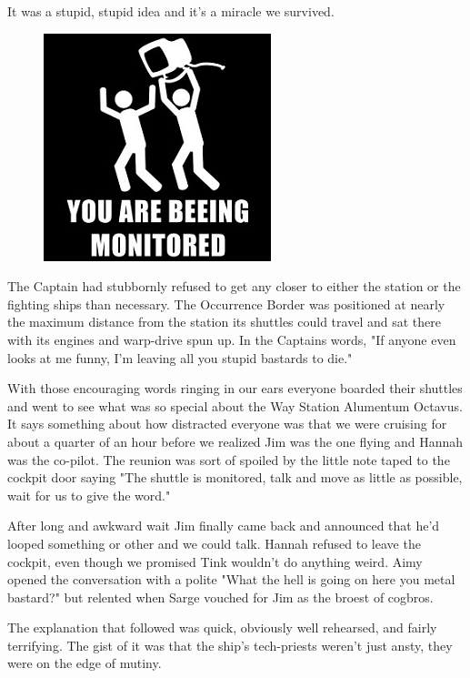 It was a stupid, stupid idea and it's a miracle we survived.

\begin{figure}
	\begin{center}
		\includegraphics[width=\figwidth]{pics/11/43.png}
	\end{center}
\end{figure}
The Captain had stubbornly refused to get any closer to either the station or the fighting ships than necessary. 
The Occurrence Border was positioned at nearly the maximum distance from the station its shuttles could travel and sat there with its engines and warp-drive spun up. 
In the Captains words, "If anyone even looks at me funny, I'm leaving all you stupid bastards to die."


With those encouraging words ringing in our ears everyone boarded their shuttles and went to see what was so special about the Way Station Alumentum Octavus. 
It says something about how distracted everyone was that we were cruising for about a quarter of an hour before we realized Jim was the one flying and Hannah was the co-pilot. 
The reunion was sort of spoiled by the little note taped to the cockpit door saying "The shuttle is monitored, talk and move as little as possible, wait for us to give the word."

After long and awkward wait Jim finally came back and announced that he'd looped something or other and we could talk. 
Hannah refused to leave the cockpit, even though we promised Tink wouldn't do anything weird. 
Aimy opened the conversation with a polite "What the hell is going on here you metal bastard?" but relented when Sarge vouched for Jim as the broest of cogbros.

The explanation that followed was quick, obviously well rehearsed, and fairly terrifying. 
The gist of it was that the ship's tech-priests weren't just ansty, they were on the edge of mutiny. 


